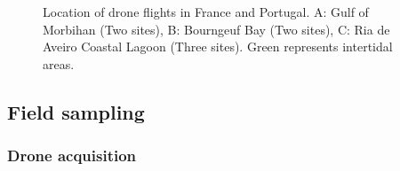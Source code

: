 \documentclass[
  number]{elsarticle}
\begin{document}
\label{cell-fig-map}
\begin{figure}[H]


\caption{\label{fig-map}Location of drone flights in France and
Portugal. A: Gulf of Morbihan (Two sites), B: Bourngeuf Bay (Two sites),
C: Ria de Aveiro Coastal Lagoon (Three sites). Green represents
intertidal areas.}

\end{figure}%

\subsection{Field sampling}\label{field-sampling}

\subsubsection{Drone acquisition}\label{drone-acquisition}
\end{document}
